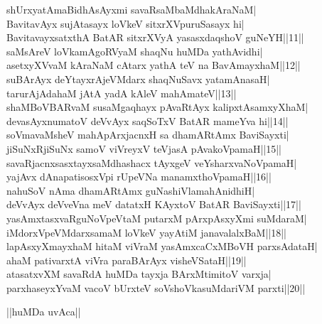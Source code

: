\documentclass{article}
\begin{document}
shUrxyatAmaBidhAsAyxmi savaRsaMbaMdhakAraNaM|\\
BavitavAyx sujAtasayx loVkeV sitxrXVpuruSasayx hi|\\
BavitavayxsatxthA BatAR sitxrXVyA yasasxdaqshoV guNeYH||11||\\
saMsAreV loVkamAgoRVyaM shaqNu huMDa yathAvidhi|\\
asetxyXVvaM kAraNaM cAtarx yathA teV na BavAmayxhaM||12||\\
suBArAyx deYtayxrAjeVMdarx shaqNuSavx yatamAnasaH|\\
tarurAjAdahaM jAtA yadA kAleV mahAmateV||13||\\
shaMBoVBARvaM susaMgaqhayx pAvaRtAyx kalipxtAsamxyXhaM|\\
devasAyxnumatoV deVvAyx saqSoTxV BatAR mameYva hi||14||\\
soVmavaMsheV mahApArxjacnxH sa dhamARtAmx BaviSayxti|\\
jiSuNxRjiSuNx samoV viVreyxV teVjasA pAvakoVpamaH||15||\\
savaRjacnxsasxtayxsaMdhashacx tAyxgeV veYsharxvaNoVpamaH|\\
yajAvx dAnapatisosxVpi rUpeVNa manamxthoVpamaH||16||\\
nahuSoV nAma dhamARtAmx guNashiVlamahAnidhiH|\\
deVvAyx deVveVna meV datatxH KAyxtoV BatAR BaviSayxti||17||\\
yasAmxtasxvaRguNoVpeVtaM putarxM pArxpAsxyXmi suMdaraM|\\
iMdorxVpeVMdarxsamaM loVkeV yayAtiM janavalalxBaM||18||\\
lapAsxyXmayxhaM hitaM viVraM yasAmxcaCxMBoVH parxsAdataH|\\
ahaM pativarxtA viVra paraBArAyx visheVSataH||19||\\
atasatxvXM savaRdA huMDa tayxja BArxMtimitoV varxja|\\
parxhaseyxYvaM vacoV bUrxteV soVshoVkasuMdariVM parxti||20||\\

\begin{center}
||huMDa uvAca||
\end{center}
\end{document}
